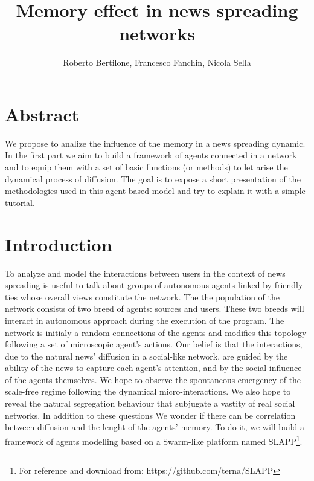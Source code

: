 \documentclass[11pt]{article} %
\title{Memory effect in news spreading networks}
\author{Roberto Bertilone, Francesco Fanchin, Nicola Sella}
\begin{document}
\maketitle
\section*{Abstract}
We propose to analize the influence of the memory in a news spreading dynamic. In the first part we aim to build a framework of agents 
connected in a network and to equip them with a set of basic functions (or methods) to let arise the dynamical process of diffusion.
The goal is to expose a short presentation of the methodologies used in this agent based model and try to explain it with a simple tutorial.

\section{Introduction}

To analyze and model the interactions between users in the context of news spreading is useful to talk about groups of autonomous agents
linked by friendly ties whose overall views constitute the network.
The the population of the network consists of two breed of agents: sources and users. These two breeds will interact
in autonomous approach during the execution of the program.
The network is initialy a random connections of the agents and modifies this topology following a set of microscopic agent's actions.
Our belief is that the interactions, due to the natural news' diffusion in a social-like network, are guided by the ability of the news
to capture each agent's attention, and by the social influence of the agents themselves.
We hope to observe the spontaneous emergency of the scale-free regime following the dynamical micro-interactions. We also hope to reveal 
the natural segregation behaviour that subjugate a vastity of real social networks.
In addition to these questions We wonder if there can be correlation between diffusion and the lenght of the agents' memory.
To do it, we will build a framework of agents modelling based on a Swarm-like platform named SLAPP\footnote{For reference and download from: https://github.com/terna/SLAPP}.
\end{document}
